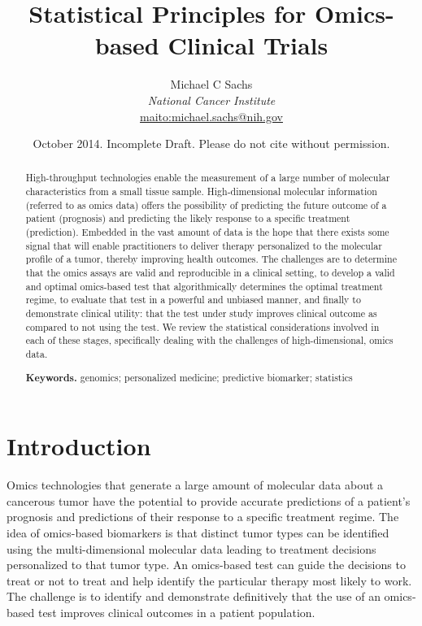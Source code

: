 \documentclass[11pt]{article}
\title{\bigskip \bigskip Statistical Principles for Omics-based Clinical Trials}
\author{\Large Michael C Sachs\vspace{0.05in} \\ \normalsize\emph{National Cancer Institute} \\ \footnotesize \url{maito:michael.sachs@nih.gov}\vspace*{0.2in}\\ }
\date{\footnotesize October 2014. Incomplete Draft. Please do not cite without permission.}
\begin{document}
  
		




\maketitle


\begin{abstract}

\noindent High-throughput technologies enable the measurement of a large number of
molecular characteristics from a small tissue sample. High-dimensional
molecular information (referred to as omics data) offers the possibility
of predicting the future outcome of a patient (prognosis) and predicting
the likely response to a specific treatment (prediction). Embedded in
the vast amount of data is the hope that there exists some signal that
will enable practitioners to deliver therapy personalized to the
molecular profile of a tumor, thereby improving health outcomes. The
challenges are to determine that the omics assays are valid and
reproducible in a clinical setting, to develop a valid and optimal
omics-based test that algorithmically determines the optimal treatment
regime, to evaluate that test in a powerful and unbiased manner, and
finally to demonstrate clinical utility: that the test under study
improves clinical outcome as compared to not using the test. We review
the statistical considerations involved in each of these stages,
specifically dealing with the challenges of high-dimensional, omics
data.

\smallskip
\noindent \textbf{Keywords.} genomics; personalized medicine; predictive biomarker; statistics

\end{abstract}


\section{Introduction}\label{introduction}

Omics technologies that generate a large amount of molecular data about
a cancerous tumor have the potential to provide accurate predictions of
a patient's prognosis and predictions of their response to a specific
treatment regime. The idea of omics-based biomarkers is that distinct
tumor types can be identified using the multi-dimensional molecular data
leading to treatment decisions personalized to that tumor type. An
omics-based test can guide the decisions to treat or not to treat and
help identify the particular therapy most likely to work. The challenge
is to identify and demonstrate definitively that the use of an
omics-based test improves clinical outcomes in a patient population.
\end{document}
